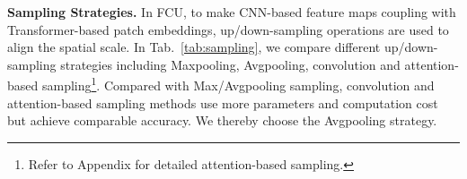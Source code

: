 \documentclass[10pt,twocolumn,letterpaper]{article}
\begin{document}
\noindent\textbf{Sampling Strategies.}
In FCU, to make CNN-based feature maps coupling with Transformer-based patch embeddings, up/down-sampling operations are used to align the spatial scale. In Tab.~\ref{tab:sampling}, we compare different up/down-sampling strategies including Maxpooling, Avgpooling, convolution and attention-based sampling\footnote{Refer to Appendix for detailed attention-based sampling.}. Compared with Max/Avgpooling sampling, convolution and attention-based sampling methods use more parameters and computation cost but achieve comparable accuracy. We thereby choose the Avgpooling strategy.
~\\

\begin{table}[t]
\begin{center}
\end{center}
\vspace{-1em}
\caption{Comparison of sampling strategies. The nearest neighbor interpolation is used.}
\label{tab:sampling}
\end{table}
\begin{table}[t]
\begin{center}
\end{center}
\vspace{-1em}
\caption{Performance comparison of ensemble models.  and  respectively denote the accuracy of the CNN and transformer branches.}
\label{tab:ensemble}
\end{table}
\end{document}
